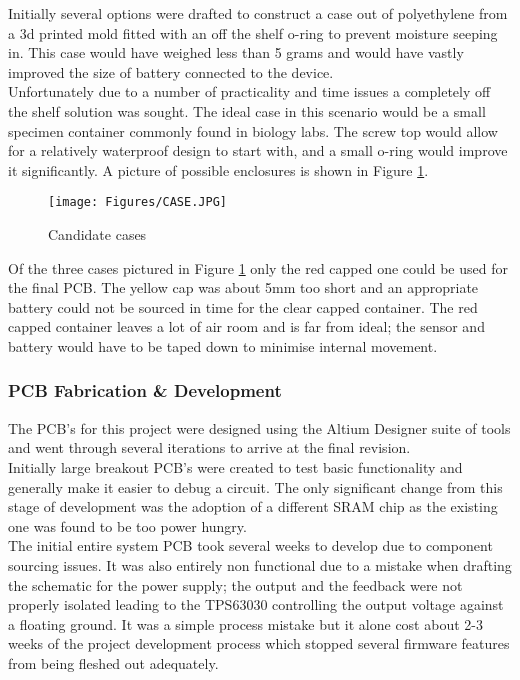 \documentclass[12pt,openany,a4paper]{book}
\begin{document}
	Initially several options were drafted to construct a case out of polyethylene from a 3d printed mold fitted with an off the shelf o-ring to prevent moisture seeping in. This case would have weighed less than 5 grams and would have vastly improved the size of battery connected to the device. \\
	
	Unfortunately due to a number of practicality and time issues a completely off the shelf solution was sought. The ideal case in this scenario would be a small specimen container commonly found in biology labs. The screw top would allow for a relatively waterproof design to start with, and a small o-ring would improve it significantly. A picture of possible enclosures is shown in Figure \ref{fig:CASE}.
	
	\begin{figure}[H]
		\centering
		\texttt{[image: Figures/CASE.JPG]}
		\caption{Candidate cases}
		\label{fig:CASE}
	\end{figure}			

	Of the three cases pictured in Figure \ref{fig:CASE} only the red capped one could be used for the final PCB. The yellow cap was about 5mm too short and an appropriate battery could not be sourced in time for the clear capped container. The red capped container leaves a lot of air room and is far from ideal; the sensor and battery would have to be taped down to minimise internal movement.\\
	
	\subsubsection{PCB Fabrication \& Development}
	The PCB's for this project were designed using the Altium Designer suite of tools and went through several iterations to arrive at the final revision. \\
	
	Initially large breakout PCB's were created to test basic functionality and generally make it easier to debug a circuit. The only significant change from this stage of development was the adoption of a different SRAM chip as the existing one was found to be too power hungry. \\
	
	The initial entire system PCB took several weeks to develop due to component sourcing issues. It was also entirely non functional due to a mistake when drafting the schematic for the power supply; the output and the feedback were not properly isolated leading to the TPS63030 controlling the output voltage against a floating ground. It was a simple process mistake but it alone cost about 2-3 weeks of the project development process which stopped several firmware features from being fleshed out adequately. \\
	
\end{document}
